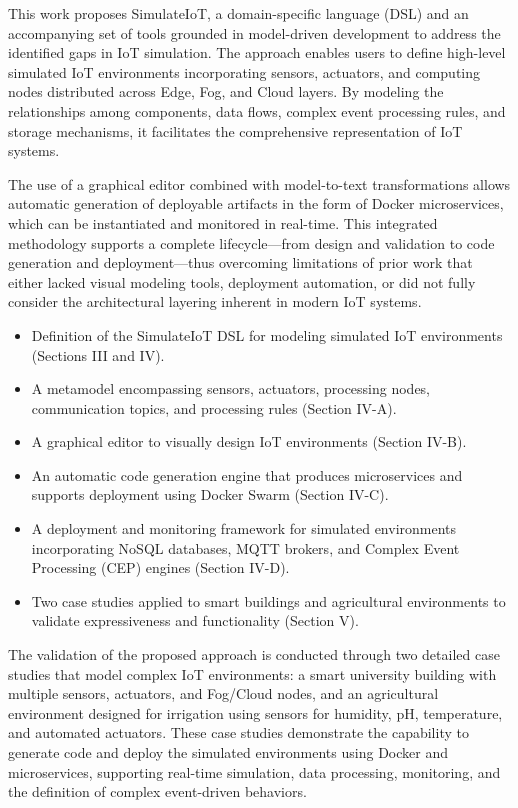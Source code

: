 \documentclass[journal]{IEEEtran}
\begin{document}
This work proposes SimulateIoT, a domain-specific language (DSL) and an accompanying set of tools grounded in model-driven development to address the identified gaps in IoT simulation. The approach enables users to define high-level simulated IoT environments incorporating sensors, actuators, and computing nodes distributed across Edge, Fog, and Cloud layers. By modeling the relationships among components, data flows, complex event processing rules, and storage mechanisms, it facilitates the comprehensive representation of IoT systems.

The use of a graphical editor combined with model-to-text transformations allows automatic generation of deployable artifacts in the form of Docker microservices, which can be instantiated and monitored in real-time. This integrated methodology supports a complete lifecycle—from design and validation to code generation and deployment—thus overcoming limitations of prior work that either lacked visual modeling tools, deployment automation, or did not fully consider the architectural layering inherent in modern IoT systems.

\begin{itemize}
  \item Definition of the SimulateIoT DSL for modeling simulated IoT environments (Sections III and IV).
  \item A metamodel encompassing sensors, actuators, processing nodes, communication topics, and processing rules (Section IV-A).
  \item A graphical editor to visually design IoT environments (Section IV-B).
  \item An automatic code generation engine that produces microservices and supports deployment using Docker Swarm (Section IV-C).
  \item A deployment and monitoring framework for simulated environments incorporating NoSQL databases, MQTT brokers, and Complex Event Processing (CEP) engines (Section IV-D).
  \item Two case studies applied to smart buildings and agricultural environments to validate expressiveness and functionality (Section V).
\end{itemize}

The validation of the proposed approach is conducted through two detailed case studies that model complex IoT environments: a smart university building with multiple sensors, actuators, and Fog/Cloud nodes, and an agricultural environment designed for irrigation using sensors for humidity, pH, temperature, and automated actuators. These case studies demonstrate the capability to generate code and deploy the simulated environments using Docker and microservices, supporting real-time simulation, data processing, monitoring, and the definition of complex event-driven behaviors.
\end{document}
